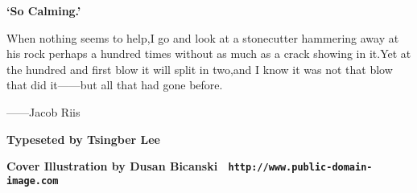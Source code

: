 \documentclass[11pt,twoside,openany,x11names,svgnames]{memoir}
\begin{document}
\begin{center}
\begin{minipage}{.8\textwidth}
\color{Cornsilk}\Large\bfseries


\begin{center}
\huge\bfseries\sffamily\color{lime}`So Calming.'
\end{center}

When nothing seems to help,I go and look at a stonecutter hammering away at his rock perhaps a hundred times without as much as a crack showing in it.Yet at the hundred and first blow it will split in two,and I know it was not that blow that did it——but all that had gone before.
\begin{flushright}
——Jacob Riis
\end{flushright}
\end{minipage}
\end{center}


\begin{center}
\colorbox{white}{\EANisbn[SC4]}

\vspace*{\baselineskip}

\textbf{\textcolor{LightGoldenrod!50!Gold}{Typeseted by Tsingber Lee}}

\vspace*{\baselineskip}

\textbf{\textcolor{LightGoldenrod}{Cover Illustration by Dusan Bicanski \textbullet\ \texttt{http://www.public-domain-image.com}}}
\end{center}
\end{document}
